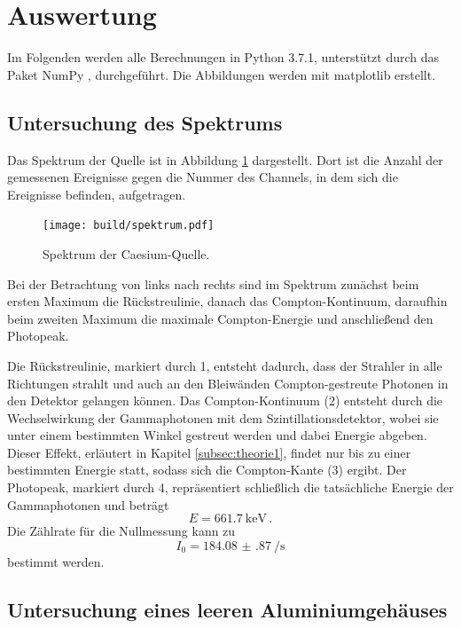 \section{Auswertung}
\label{sec:Auswertung}

Im Folgenden werden alle Berechnungen in Python 3.7.1, unterstützt durch das
Paket NumPy \cite{numpy}, durchgeführt. Die Abbildungen werden mit matplotlib \cite{matplotlib} erstellt.

\subsection{Untersuchung des Spektrums}

Das Spektrum der Quelle ist in Abbildung \ref{fig:spektrum} dargestellt. Dort ist die Anzahl der gemessenen Ereignisse gegen die Nummer des Channels, in dem sich die Ereignisse befinden, aufgetragen.

\begin{figure}
  \centering
  \texttt{[image: build/spektrum.pdf]}
  \caption{Spektrum der Caesium-Quelle.}
  \label{fig:spektrum}
\end{figure}

Bei der Betrachtung von links nach rechts sind im Spektrum zunächst beim ersten
Maximum die Rückstreulinie, danach das Compton-Kontinuum, daraufhin beim zweiten
Maximum die maximale Compton-Energie und anschließend den Photopeak.

Die Rückstreulinie, markiert durch 1, entsteht dadurch, dass der Strahler in alle Richtungen strahlt und auch an den Bleiwänden Compton-gestreute Photonen in den Detektor gelangen können. Das Compton-Kontinuum (2) entsteht durch die Wechselwirkung der Gammaphotonen mit dem Szintillationsdetektor, wobei sie unter einem bestimmten Winkel gestreut werden und dabei Energie abgeben. Dieser Effekt, erläutert in Kapitel \ref{subsec:theorie1}, findet nur bis zu einer bestimmten Energie statt, sodass sich die Compton-Kante (3) ergibt.
Der Photopeak, markiert durch 4, repräsentiert schließlich die tatsächliche Energie der Gammaphotonen
und beträgt \cite{energie}
\begin{equation*}
  E=\SI{661.7}{\kilo\eV} \,.
\end{equation*}
Die Zählrate für die Nullmessung kann zu
\begin{equation*}
  I_0=\SI{184.08(87)}{\per \second}
\end{equation*}
bestimmt werden.

\subsection{Untersuchung eines leeren Aluminiumgehäuses}


